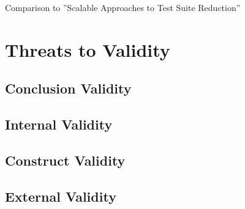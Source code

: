 Comparison to ''Scalable Approaches to Test Suite Reduction''

\section{Threats to Validity}

\subsection{Conclusion Validity}

\subsection{Internal Validity}

\subsection{Construct Validity}

\subsection{External Validity}
